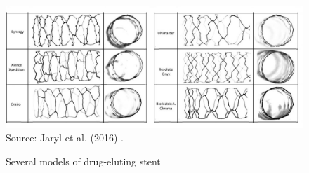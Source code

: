 \begin{figure}[H]
 \caption{Several models of drug-eluting stent}
  \includegraphics[scale=0.66]{./02_chaps/cap_review/figure/stent_drug.jpg}\\
 \source Source: Jaryl et al. (2016) \cite{stent2016}.
 \label{stent drug}
\end{figure}

